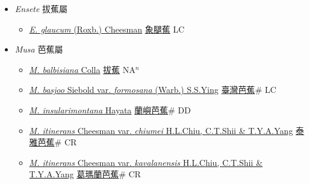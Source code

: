 
  \begin{itemize}
 \item[] \textit{Ensete} 拔蕉屬
                    
  \begin{itemize}
        \item[] \href{http://www.theplantlist.org/tpl1.1/search?q=Ensete+glaucum}{\textit{E. glaucum} (Roxb.) Cheesman}   \href{\detokenize{http://taibnet.sinica.edu.tw/chi/taibnet_species_list.php?T2=象腿蕉&T2_new_value=true&fr=y}}{象腿蕉} LC
  \end{itemize}
 \item[] \textit{Musa} 芭蕉屬
                    
  \begin{itemize}
        \item[] \href{http://www.theplantlist.org/tpl1.1/search?q=Musa+balbisiana}{\textit{M. balbisiana} Colla}   \href{\detokenize{http://taibnet.sinica.edu.tw/chi/taibnet_species_list.php?T2=拔蕉&T2_new_value=true&fr=y}}{拔蕉} NA$^n$
        \item[] \href{http://www.theplantlist.org/tpl1.1/search?q=Musa+basjoo+var.+formosana}{\textit{M. basjoo} Siebold var. \textit{formosana} (Warb.) S.S.Ying}   \href{\detokenize{http://taibnet.sinica.edu.tw/chi/taibnet_species_list.php?T2=臺灣芭蕉&T2_new_value=true&fr=y}}{臺灣芭蕉}\# LC
        \item[] \href{http://www.theplantlist.org/tpl1.1/search?q=Musa+insularimontana}{\textit{M. insularimontana} Hayata}   \href{\detokenize{http://taibnet.sinica.edu.tw/chi/taibnet_species_list.php?T2=蘭嶼芭蕉&T2_new_value=true&fr=y}}{蘭嶼芭蕉}\# DD
        \item[] \href{http://www.theplantlist.org/tpl1.1/search?q=Musa+itinerans+var.+chiumei}{\textit{M. itinerans} Cheesman var. \textit{chiumei} H.L.Chiu, C.T.Shii \& T.Y.A.Yang}   \href{\detokenize{http://taibnet.sinica.edu.tw/chi/taibnet_species_list.php?T2=泰雅芭蕉&T2_new_value=true&fr=y}}{泰雅芭蕉}\# CR
        \item[] \href{http://www.theplantlist.org/tpl1.1/search?q=Musa+itinerans+var.+kavalanensis}{\textit{M. itinerans} Cheesman var. \textit{kavalanensis} H.L.Chiu, C.T.Shii \& T.Y.A.Yang}   \href{\detokenize{http://taibnet.sinica.edu.tw/chi/taibnet_species_list.php?T2=葛瑪蘭芭蕉&T2_new_value=true&fr=y}}{葛瑪蘭芭蕉}\# CR

\end{itemize}
\end{itemize}
